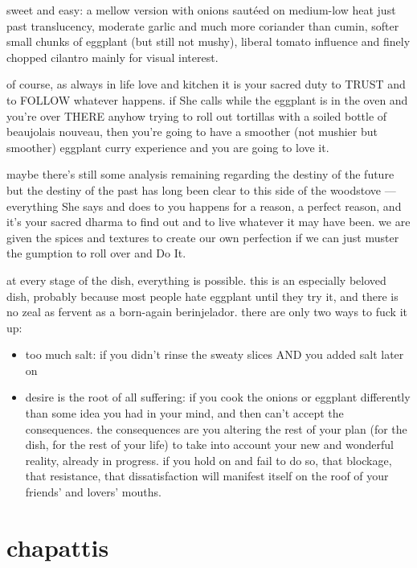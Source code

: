 sweet and easy: a mellow version with onions saut\'{e}ed on medium-low heat 
just past translucency, moderate garlic and much more coriander than cumin, 
softer small chunks of eggplant (but still not mushy), liberal tomato influence 
and finely chopped cilantro mainly for visual interest.

of course, as always in life love and kitchen it is your sacred duty to TRUST 
and to FOLLOW whatever happens. if She calls while the eggplant is in the oven 
and you're over THERE anyhow trying to roll out tortillas with a soiled bottle 
of beaujolais nouveau, then you're going to have a smoother (not mushier but 
smoother) eggplant curry experience and you are going to love it.

maybe there's still some analysis remaining regarding the destiny of the future 
but the destiny of the past has long been clear to this side of the woodstove 
--- everything She says and does to you happens for a reason, a perfect reason, 
and it's your sacred dharma to find out and to live whatever it may have been. 
we are given the spices and textures to create our own perfection if we can 
just muster the gumption to roll over and Do It.

at every stage of the dish, everything is possible. this is an especially 
beloved dish, probably because most people hate eggplant until they try it, and 
there is no zeal as fervent as a born-again berinjelador. there are only two 
ways to fuck it up:

\begin{itemize}
  \item too much salt: if you didn't rinse the sweaty slices AND you added salt 
  later on
	
  \item desire is the root of all suffering: if you cook the onions or eggplant 
  differently than some idea you had in your mind, and then can't accept the 
  consequences. the consequences are you altering the rest of your plan (for 
  the dish, for the rest of your life) to take into account your new and 
  wonderful reality, already in progress. if you hold on and fail to do so, 
  that blockage, that resistance, that dissatisfaction will manifest itself on 
  the roof of your friends' and lovers' mouths.
\end{itemize}

\section{chapattis}

